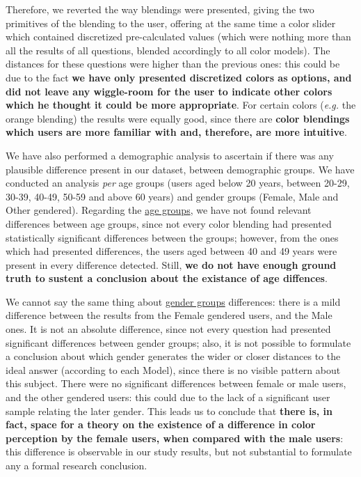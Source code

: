 Therefore, we reverted the way blendings were presented, giving the two primitives of the blending to the user, offering at the same time a color slider which contained discretized pre-calculated values (which were nothing more than all the results of all questions,
blended accordingly to all color models). The distances for these questions were higher than the previous ones: this could be due to the fact \textbf{we have only presented discretized colors as options, and did not leave any wiggle-room for the user to indicate other
colors which he thought it could be more appropriate}. For certain colors (\emph{e.g.} the orange blending) the results were equally good, since there are \textbf{color blendings which users are more familiar with and, therefore, are more intuitive}. \par
%
We have also performed a demographic analysis to ascertain if there was any plausible difference present in our dataset, between demographic groups. We have conducted an analysis \emph{per} age groups (users aged below 20 years, between 20-29, 30-39, 40-49, 50-59 and
above 60 years) and gender groups (Female, Male and Other gendered). Regarding the \ul{age groups}, we have not found relevant differences between age groups, since not every color blending had presented statistically significant differences between the groups; however,
from the ones which had presented differences, the users aged between 40 and 49 years were present in every difference detected. Still, \textbf{we do not have enough ground truth to sustent a conclusion about the existance of age diffences}. \par
%
We cannot say the same thing about \ul{gender groups} differences: there is a mild difference between the results from the Female gendered users, and the Male ones. It is not an absolute difference, since not every question had presented significant differences between
gender groups; also, it is not possible to formulate a conclusion about which gender generates the wider or closer distances to the ideal answer (according to each Model), since there is no visible pattern about this subject. There were no significant differences
between female or male users, and the other gendered users: this could due to the lack of a significant user sample relating the later gender. This leads us to conclude that \textbf{there is, in fact, space for a theory on the existence of a difference in color
perception by the female users, when compared with the male users}: this difference is observable in our study results, but not substantial to formulate any a formal research conclusion. \par
